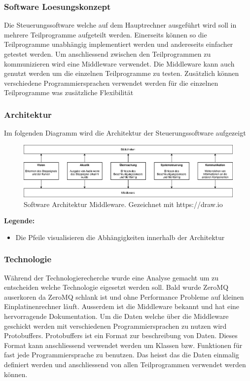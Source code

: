 \documentclass[../../main.tex]{subfiles}
\begin{document}
\subsubsection{Software Loesungskonzept}
Die Steuerungssoftware welche auf dem Hauptrechner ausgeführt wird soll in mehrere Teilprogramme aufgeteilt werden.
Einerseits können so die Teilprogramme unabhängig implementiert werden und andereseits einfacher getestet werden.
Um anschliessend zwischen den Teilprogrammen zu kommunizieren wird eine Middleware verwendet. Die Middleware kann auch genutzt werden
um die einzelnen Teilprogramme zu testen. Zusätzlich können verschiedene Programmiersprachen verwendet werden für die einzelnen Teilprogramme
was zusätzliche Flexibilität

\subsubsection{Architektur}
Im folgenden Diagramm wird die Architektur der Steuerungssoftware aufgezeigt
\begin{figure}[H] %
    \centering
    \includegraphics[width=1.0\textwidth]{../../drawings/ArchitekturDiagramm/SW_Architektur_Middleware.png}
    \caption {Software Architektur Middleware. Gezeichnet mit https://draw.io}
\end{figure}

\textbf{Legende:}
\begin{itemize}
    \item Die Pfeile visualisieren die Abhängigkeiten innerhalb der Architektur
\end{itemize}

\subsubsection{Technologie}
Während der Technologierecherche wurde eine Analyse gemacht um zu entscheiden welche Technologie eigesetzt werden soll. Bald wurde ZeroMQ
auserkoren da ZeroMQ schlank ist und ohne Performance Probleme auf kleinen Einplatinenrechner läuft. Ausserdem ist die Middleware bekannt
und hat eine hervorragende Dokumentation. Um die Daten welche über die Middleware geschickt werden mit verschiedenen Programmiersprachen zu
nutzen wird Protobuffers. Protobuffers ist ein Format zur beschreibung von Daten. Dieses Format kann anschliessend verwendet werden um
Klassen bzw. Funktionen für fast jede Programmiersprache zu benutzen. Das heisst das die Daten einmalig definiert werden und anschliessend von
allen Teilprogrammen verwendet werden können.
\end{document}
